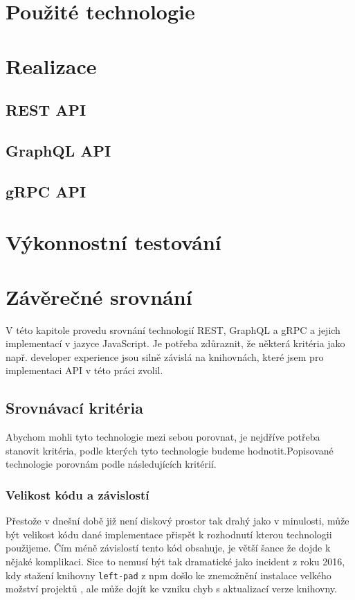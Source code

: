 \documentclass[thesis=M,czech]{FITthesis}[2019/12/23]
\begin{document}
\chapter{Použité technologie}

\chapter{Realizace}
\section{REST API}
\section{GraphQL API}
\section{gRPC API}

\chapter{Výkonnostní testování}
\label{load_test}

\chapter{Závěrečné srovnání}
V této kapitole provedu srovnání technologií REST, GraphQL a gRPC a jejich implementací v jazyce JavaScript. Je potřeba zdůraznit, že některá kritéria jako např. developer experience jsou silně závislá na knihovnách, které jsem pro implementaci API v této práci zvolil.


\section{Srovnávací kritéria}
Abychom mohli tyto technologie mezi sebou porovnat, je nejdříve potřeba stanovit kritéria, podle kterých tyto technologie budeme hodnotit.Popisované technologie porovnám podle následujících kritérií.

\subsection{Velikost kódu a závislostí}
Přestože v dnešní době již není diskový prostor tak drahý jako v minulosti, může být velikost kódu dané implementace přispět k rozhodnutí kterou technologii použijeme. Čím méně závislostí tento kód obsahuje, je větší šance že dojde k nějaké komplikaci. Sice to nemusí být tak dramatické jako incident z roku 2016, kdy stažení knihovny \texttt{left-pad} z npm došlo ke znemožnění instalace velkého možství projektů \cite{left_pad},  ale může dojít ke vzniku chyb s aktualizací verze knihovny.
\end{document}
